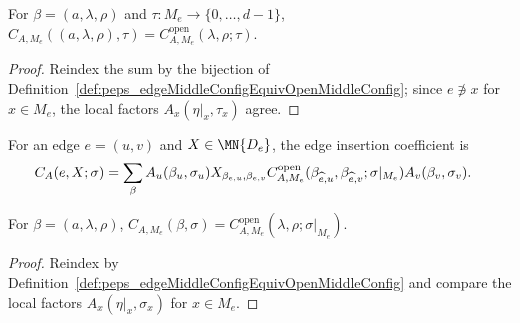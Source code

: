 \begin{lemma}%
    \label{thm:peps_edgeMiddleWeightOn_eq_edgeOpenMiddleWeightOn}
    \leanok
    For $\beta=(a,\lambda,\rho)$ and $\tau:M_e\to\{0,\ldots,d-1\}$,
    $C_{A,M_e}((a,\lambda,\rho),\tau)=C^{\mathrm{open}}_{A,M_e}(\lambda,\rho;\tau)$.
\end{lemma}
\begin{proof}\leanok
    Reindex the sum by the bijection of
    Definition~\ref{def:peps_edgeMiddleConfigEquivOpenMiddleConfig}; since
    $e\not\ni x$ for $x\in M_e$, the local factors $A_x(\eta|_x,\tau_x)$ agree.
\end{proof}

\begin{definition}%
    \label{def:peps_edgeInsertedCoeff}
    \leanok
    For an edge $e=(u,v)$ and $X\in\MN{D_e}$, the edge insertion coefficient is
    \begin{align}
        C_A(e,X;\sigma)
         & =
        \sum_{\beta}
        A_u(\beta_u,\sigma_u)
        X_{\beta_{e,u},\beta_{e,v}}
        C^{\mathrm{open}}_{A,M_e}
        (\beta_{\widehat e,u},\beta_{\widehat e,v};
        \sigma|_{M_e})
        A_v(\beta_v,\sigma_v).
        \notag
    \end{align}
\end{definition}

\begin{lemma}%
    \label{thm:peps_edgeMiddleWeight_eq_edgeOpenMiddleWeight}
    \leanok
    For $\beta=(a,\lambda,\rho)$,
    $C_{A,M_e}(\beta,\sigma)=C^{\mathrm{open}}_{A,M_e}(\lambda,\rho;\sigma|_{M_e})$.
\end{lemma}
\begin{proof}\leanok
    Reindex by Definition~\ref{def:peps_edgeMiddleConfigEquivOpenMiddleConfig}
    and compare the local factors $A_x(\eta|_x,\sigma_x)$ for $x\in M_e$.
\end{proof}

